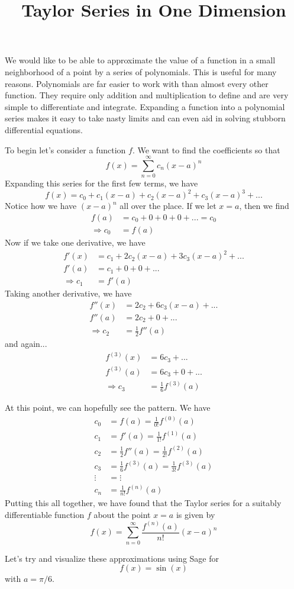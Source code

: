 \documentclass{article}
\title{Taylor Series in One Dimension}
\begin{document}
We would like to be able to approximate the value of a function in a small
neighborhood of a point by a series of polynomials. This is useful for many reasons.
Polynomials are far easier to work with than almost every other function. They
require only addition and multiplication to define and are very simple to
differentiate and integrate. Expanding a function into a polynomial series makes
it easy to take nasty limits and can even aid in solving stubborn differential
equations. 


To begin let's consider a function $f$. We want to find the coefficients so that
\begin{equation}
  f(x) = \sum\limits_{n=0}^\infty c_n(x-a)^n
\end{equation}
Expanding this series for the first few terms, we have
\begin{equation}
  f(x) = c_0 + c_1(x-a) + c_2(x-a)^2 + c_3(x-a)^3 + ...
\end{equation}
Notice how we have $(x-a)^n$ all over the place. If we let $x=a$, then we find
\begin{align}
  f(a) &= c_0 + 0 + 0 + 0 + ...  = c_0   \\
  \Rightarrow c_0 &= f(a)
\end{align}
Now if we take one derivative, we have
\begin{align}
  f'(x) &= c_1 + 2c_2(x-a) + 3c_3(x-a)^2 + ... \\
  f'(a) &= c_1 + 0 + 0 + ... \\
  \Rightarrow c_1 &= f'(a)
\end{align}
Taking another derivative, we have
\begin{align}
  f''(x)&= 2c_2  +6c_3(x-a) + ... \\
  f''(a)&= 2c_2 + 0 + ... \\
  \Rightarrow c_2 &= \frac{1}{2}f''(a)
\end{align}
and again...
\begin{align}
  f^{(3)}(x) &= 6c_3 + ... \\
  f^{(3)}(a) &= 6c_3 + 0 + ... \\
  \Rightarrow c_3 &= \frac{1}{6}f^{(3)}(a)
\end{align}

At this point, we can hopefully see the pattern. We have
\begin{align}
  c_0 &= f(a) = \frac{1}{0!}f^{(0)}(a) \\
  c_1 &= f'(a) = \frac{1}{1!}f^{(1)}(a) \\
  c_2 &= \frac{1}{2}f''(a) = \frac{1}{2!}f^{(2)}(a) \\
  c_3 &= \frac{1}{6}f^{(3)}(a) = \frac{1}{3!}f^{(3)}(a) \\
  \vdots &= \vdots \\
  c_n &= \frac{1}{n!}f^{(n)}(a)
\end{align}
Putting this all together, we have found that the Taylor series for a suitably
differentiable function $f$ about the point $x=a$ is given by
\begin{equation}
  f(x) = \sum\limits_{n=0}^\infty\frac{f^{(n)}(a)}{n!}(x-a)^n
\end{equation}

Let's try and visualize these approximations using Sage for
\begin{equation}
  f(x) = \sin(x)
\end{equation}
with $a = \pi/6$. 

\end{document}
